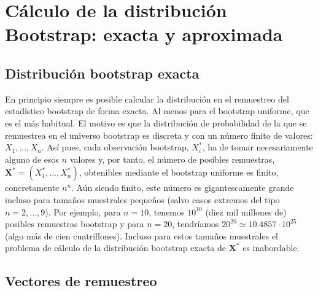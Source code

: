 \documentclass[
]{book}
\theoremstyle{definition}
\theoremstyle{definition}
\theoremstyle{definition}
\theoremstyle{remark}
\begin{document}
\hypertarget{cuxe1lculo-de-la-distribuciuxf3n-bootstrap-exacta-y-aproximada}{%
\section{Cálculo de la distribución Bootstrap: exacta y aproximada}\label{cuxe1lculo-de-la-distribuciuxf3n-bootstrap-exacta-y-aproximada}}

\hypertarget{distribuciuxf3n-bootstrap-exacta}{%
\subsection{Distribución bootstrap exacta}\label{distribuciuxf3n-bootstrap-exacta}}

En principio siempre es posible calcular la distribución en el
remuestreo del estadístico bootstrap de forma exacta. Al menos para el
bootstrap uniforme, que es el más habitual. El motivo es que la
distribución de probabilidad de la que se remuestrea en el universo
bootstrap es discreta y con un número finito de valores: \(X_1,\ldots ,X_n\). Así pues, cada observación bootstrap, \(X_i^{\ast}\), ha de
tomar necesariamente alguno de esos \(n\) valores y, por tanto, el número
de posibles remuestras, \(\mathbf{X}^{\ast}=\left( X_1^{\ast },\ldots ,X_n^{\ast} \right)\), obtenibles mediante el bootstrap
uniforme es finito, concretamente \(n^{n}\). Aún siendo finito, este
número es gigantescamente grande incluso para tamaños muestrales
pequeños (salvo casos extremos del tipo \(n=2,\ldots ,9\)). Por ejemplo,
para \(n=10\), tenemos \(10^{10}\) (diez mil millones de) posibles
remuestras bootstrap y para \(n=20\), tendríamos
\(20^{20}\simeq 10.4857\cdot 10^{25}\) (algo más de cien
cuatrillones). Incluso para estos tamaños muestrales el problema de
cálculo de la distribución bootstrap exacta de
\(\mathbf{X}^{\ast}\) es inabordable.

\hypertarget{vectores-de-remuestreo}{%
\subsection{Vectores de remuestreo}\label{vectores-de-remuestreo}}
\end{document}
